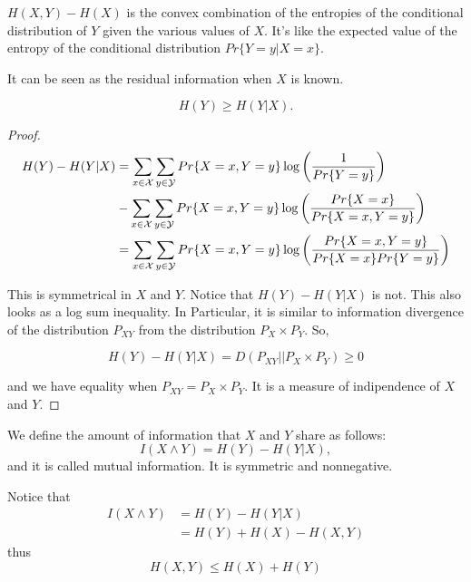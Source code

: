 $H(X, Y) - H(X)$ is the convex combination of the entropies of the conditional distribution of $Y$ given the various values of $X$. It's like the expected value of the entropy of the conditional distribution $Pr\{Y=y | X=x\}$.

It can be seen as the residual information when $X$ is known.

\begin{prop}
\begin{equation}
H(Y) \geq H(Y|X). 
\end{equation}
\end{prop}

\begin{proof}
\begin{align*}
 H(Y) - H(Y|X) & = \sum_{x \in \mathcal{X}} \sum_{y \in \mathcal{Y}}Pr\{X=x, Y=y\}\log\left(\dfrac{1}{Pr\{Y=y\}}\right)\\ 
 & - \sum_{x \in \mathcal{X}}\sum_{y \in \mathcal{Y}} Pr\{X=x, Y=y\}\log\left(\dfrac{Pr\{X=x\}}{Pr\{X=x, Y=y\}}\right)\\
  & =  \sum_{x\in \mathcal{X}} \sum_{y \in \mathcal{Y}} Pr\{X=x, Y=y\}\log\left(\dfrac{Pr\{X=x, Y=y\}}{Pr\{X=x\}Pr\{Y=y\}}\right)
\end{align*}



This is symmetrical in $X$ and $Y$. Notice that $H(Y) - H(Y|X)$ is not. This also looks as a log sum inequality. In Particular, it is similar to information divergence of the distribution $P_{XY}$ from the distribution $P_X \times P_Y$. So,

\begin{equation}
 H(Y) - H(Y|X) = D(P_{XY}||P_X \times P_Y) \geq 0 
\end{equation}


and we have equality when $P_{XY} = P_X \times P_Y$. It is a measure of indipendence of $X$ and $Y$.
\end{proof}
\begin{definition}
We define the amount of information that $X$ and $Y$ share as follows:
\begin{equation}
I(X \wedge Y) = H(Y) - H(Y|X), 
\end{equation}
and it is called mutual information. It is symmetric and nonnegative. 
\end{definition}

Notice that
\begin{align*}
 I(X \wedge Y) &= H(Y) - H(Y|X) \\&= H(Y) + H(X) - H(X, Y) 
\end{align*}
thus
\begin{equation}
 H(X, Y) \leq H(X) + H(Y) 
\end{equation}

